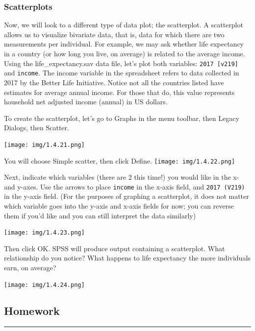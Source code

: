 \documentclass[
]{book}
\begin{document}
\hypertarget{scatterplots}{%
\subsubsection{Scatterplots}\label{scatterplots}}

Now, we will look to a different type of data plot; the scatterplot. A scatterplot allows us to visualize bivariate data, that is, data for which there are two measurements per individual. For example, we may ask whether life expectancy in a country (or how long you live, on average) is related to the average income. Using the life\_expectancy.sav data file, let's plot both variables: \texttt{2017\ {[}v219{]}} and \texttt{income}. The income variable in the spreadsheet refers to data collected in 2017 by the Better Life Initiative. Notice not all the countries listed have estimates for average annual income. For those that do, this value represents household net adjusted income (annual) in US dollars.

To create the scatterplot, let's go to {Graphs} in the menu toolbar, then {Legacy Dialogs}, then {Scatter}.

\texttt{[image: img/1.4.21.png]}

You will choose {Simple} scatter, then click {Define}.
\texttt{[image: img/1.4.22.png]}

Next, indicate which variables (there are 2 this time!) you would like in the x- and y-axes. Use the arrows to place \texttt{income} in the x-axis field, and \texttt{2017\ (V219)} in the y-axis field. (For the purposes of graphing a scatterplot, it does not matter which variable goes into the y-axis and x-axis fields for now; you can reverse them if you'd like and you can still interpret the data similarly)

\texttt{[image: img/1.4.23.png]}

Then click {OK}.
SPSS will produce output containing a scatterplot. What relationship do you notice? What happens to life expectancy the more individuals earn, on average?

\texttt{[image: img/1.4.24.png]}

\hypertarget{homework-1}{%
\subsection{Homework}\label{homework-1}}

\begin{center}\rule{0.5\linewidth}{0.5pt}\end{center}
\end{document}
